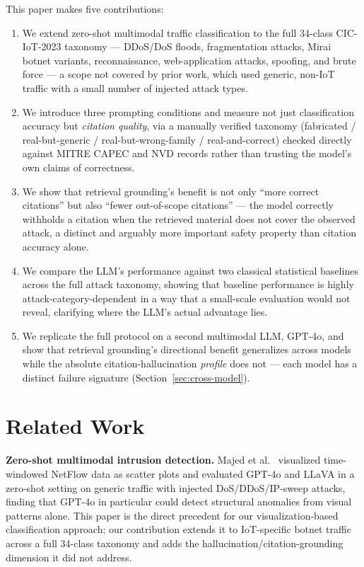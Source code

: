 \documentclass[10pt,twocolumn]{article}
\begin{document}
This paper makes five contributions:

\begin{enumerate}[nosep]
\item We extend zero-shot multimodal traffic classification to the full 34-class CIC-IoT-2023 taxonomy --- DDoS/DoS floods, fragmentation attacks, Mirai botnet variants, reconnaissance, web-application attacks, spoofing, and brute force --- a scope not covered by prior work, which used generic, non-IoT traffic with a small number of injected attack types.
\item We introduce three prompting conditions and measure not just classification accuracy but \emph{citation quality}, via a manually verified taxonomy (fabricated / real-but-generic / real-but-wrong-family / real-and-correct) checked directly against MITRE CAPEC and NVD records rather than trusting the model's own claims of correctness.
\item We show that retrieval grounding's benefit is not only ``more correct citations'' but also ``fewer out-of-scope citations'' --- the model correctly withholds a citation when the retrieved material does not cover the observed attack, a distinct and arguably more important safety property than citation accuracy alone.
\item We compare the LLM's performance against two classical statistical baselines across the full attack taxonomy, showing that baseline performance is highly attack-category-dependent in a way that a small-scale evaluation would not reveal, clarifying where the LLM's actual advantage lies.
\item We replicate the full protocol on a second multimodal LLM, GPT-4o, and show that retrieval grounding's directional benefit generalizes across models while the absolute citation-hallucination \emph{profile} does not --- each model has a distinct failure signature (Section~\ref{sec:cross-model}).
\end{enumerate}

\section{Related Work}

\textbf{Zero-shot multimodal intrusion detection.} Majed et al.~\cite{netflowviz} visualized time-windowed NetFlow data as scatter plots and evaluated GPT-4o and LLaVA in a zero-shot setting on generic traffic with injected DoS/DDoS/IP-sweep attacks, finding that GPT-4o in particular could detect structural anomalies from visual patterns alone. This paper is the direct precedent for our visualization-based classification approach; our contribution extends it to IoT-specific botnet traffic across a full 34-class taxonomy and adds the hallucination/citation-grounding dimension it did not address.
\end{document}
